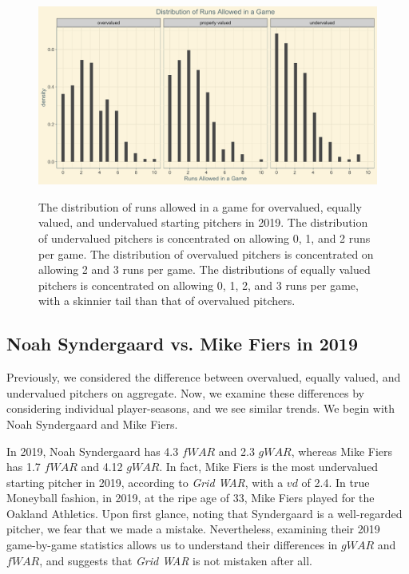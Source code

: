 \documentclass[12pt]{article}
\begin{document}
\begin{figure}[t!]
\centering
\caption{The distribution of runs allowed in a game for overvalued, equally valued, and undervalued starting pitchers in 2019. The distribution of undervalued pitchers is concentrated on allowing 0, 1, and 2 runs per game. The distribution of overvalued pitchers is concentrated on allowing 2 and 3 runs per game. The distributions of equally valued pitchers is concentrated on allowing 0, 1, 2, and 3 runs per game, with a skinnier tail than that of overvalued pitchers. } 
\includegraphics[width=15cm]{../writeup_plots/plot_cumRuns_aggregated_2019.png}
\label{fig:cumRunsAggregated19}
\end{figure}

\subsection{Noah Syndergaard vs. Mike Fiers in 2019}

Previously, we considered the difference between overvalued, equally valued, and undervalued pitchers on aggregate. Now, we examine these differences by considering individual player-seasons, and we see similar trends. We begin with Noah Syndergaard and Mike Fiers. 

In 2019,  Noah Syndergaard has 4.3 $fWAR$ and 2.3 $gWAR$, whereas Mike Fiers has 1.7 $fWAR$ and 4.12 $gWAR$. In fact, Mike Fiers is the most undervalued starting pitcher in 2019, according to \textit{Grid WAR}, with a $vd$ of 2.4. In true Moneyball fashion, in 2019, at the ripe age of 33, Mike Fiers played for the Oakland Athletics. Upon first glance, noting that Syndergaard is a well-regarded pitcher, we fear that we made a mistake. Nevertheless, examining their 2019 game-by-game statistics allows us to understand their differences in $gWAR$ and $fWAR$, and suggests that \textit{Grid WAR} is not mistaken after all.
\end{document}
